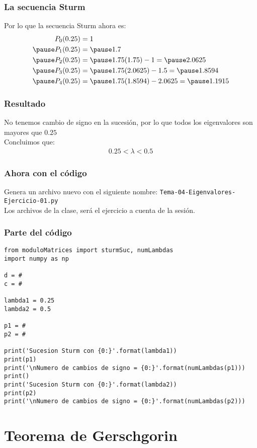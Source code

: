 \documentclass[12pt]{beamer}
\begin{document}
\begin{frame}
\frametitle{La secuencia Sturm}
Por lo que la secuencia Sturm ahora es:
\begin{eqnarray*}
\begin{aligned}
P_{0} (0.25) &= 1 \\ \pause 
P_{1} (0.25) &= \pause 1.7 \\ \pause 
P_{2} (0.25) &= \pause 1.75 (1.75) - 1 =  \pause 2.0625 \\ \pause 
P_{3} (0.25) &= \pause 1.75 (2.0625) - 1.5 = \pause 1.8594 \\ \pause 
P_{4} (0.25) &= \pause 1.75 (1.8594) - 2.0625 = \pause 1.1915
\end{aligned}
\end{eqnarray*}
\pause
\end{frame}    
\begin{frame}
\frametitle{Resultado}
No tenemos cambio de signo en la sucesión, por lo que todos los eigenvalores son mayores que $0.25$
\\
\bigskip
\pause
Concluimos que:
\begin{align*}
0.25 < \lambda < 0.5
\end{align*}
\end{frame}
\begin{frame}
\frametitle{Ahora con el código}
Genera un archivo nuevo con el siguiente nombre:
\medskip
\texttt{Tema-04-Eigenvalores-Ejercicio-01.py}
\\
\medskip
\pause
Los archivos de la clase, será el ejercicio a cuenta de la sesión.
\end{frame}
\begin{frame}
\frametitle{Parte del código}
\begin{lstlisting}[caption=Parte del código para la sucesión de Sturm]
from moduloMatrices import sturmSuc, numLambdas
import numpy as np

d = #
c = #

lambda1 = 0.25
lambda2 = 0.5

p1 = #
p2 = #

print('Sucesion Sturm con {0:}'.format(lambda1))
print(p1)
print('\nNumero de cambios de signo = {0:}'.format(numLambdas(p1)))
print()
print('Sucesion Sturm con {0:}'.format(lambda2))
print(p2)
print('\nNumero de cambios de signo = {0:}'.format(numLambdas(p2)))
\end{lstlisting}
\end{frame}

\section{Teorema de Gerschgorin}
\end{document}
